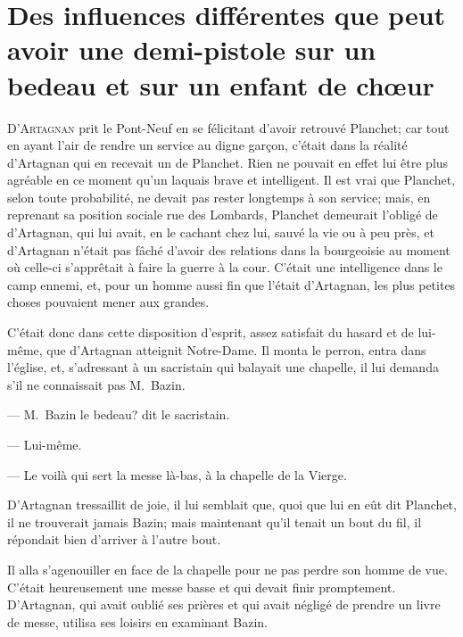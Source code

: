 \chapter[Des influences différentes que peut avoir une demi-pistole]{Des influences différentes que peut avoir une demi-pistole sur un bedeau et sur un enfant de chœur}

\lettrine{D}{'Artagnan} prit le Pont-Neuf en se félicitant d'avoir retrouvé Planchet; car tout en ayant l'air de rendre un service au digne garçon, c'était dans la réalité d'Artagnan qui en recevait un de Planchet. Rien ne pouvait en effet lui être plus agréable en ce moment qu'un laquais brave et intelligent. Il est vrai que Planchet, selon toute probabilité, ne devait pas rester longtemps à son service; mais, en reprenant sa position sociale rue des Lombards, Planchet demeurait l'obligé de d'Artagnan, qui lui avait, en le cachant chez lui, sauvé la vie ou à peu près, et d'Artagnan n'était pas fâché d'avoir des relations dans la bourgeoisie au moment où celle-ci s'apprêtait à faire la guerre à la cour. C'était une intelligence dans le camp ennemi, et, pour un homme aussi fin que l'était d'Artagnan, les plus petites choses pouvaient mener aux grandes.

C'était donc dans cette disposition d'esprit, assez satisfait du hasard et de lui-même, que d'Artagnan atteignit Notre-Dame. Il monta le perron, entra dans l'église, et, s'adressant à un sacristain qui balayait une chapelle, il lui demanda s'il ne connaissait pas M.~Bazin.

— M.~Bazin le bedeau? dit le sacristain.

— Lui-même.

— Le voilà qui sert la messe là-bas, à la chapelle de la Vierge.

D'Artagnan tressaillit de joie, il lui semblait que, quoi que lui en eût dit Planchet, il ne trouverait jamais Bazin; mais maintenant qu'il tenait un bout du fil, il répondait bien d'arriver à l'autre bout.

Il alla s'agenouiller en face de la chapelle pour ne pas perdre son homme de vue. C'était heureusement une messe basse et qui devait finir promptement. D'Artagnan, qui avait oublié ses prières et qui avait négligé de prendre un livre de messe, utilisa ses loisirs en examinant Bazin.

